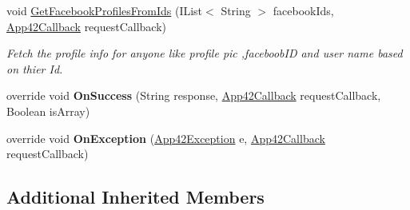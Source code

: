 \begin{DoxyCompactItemize}
void \hyperlink{classcom_1_1shephertz_1_1app42_1_1paas_1_1sdk_1_1windows_1_1social_1_1_social_service_aa997a27f1803f5eb098f029529e848f6}{Get\+Facebook\+Profiles\+From\+Ids} (I\+List$<$ String $>$ facebook\+Ids, \hyperlink{interfacecom_1_1shephertz_1_1app42_1_1paas_1_1sdk_1_1windows_1_1_app42_callback}{App42\+Callback} request\+Callback)
\begin{DoxyCompactList}\small\item\em Fetch the profile info for anyone like profile pic ,faceboob\+I\+D and user name based on thier Id. \end{DoxyCompactList}\item 
\hypertarget{classcom_1_1shephertz_1_1app42_1_1paas_1_1sdk_1_1windows_1_1social_1_1_social_service_a6af69417c29297fec7b07ab0f7f36aae}{override void {\bfseries On\+Success} (String response, \hyperlink{interfacecom_1_1shephertz_1_1app42_1_1paas_1_1sdk_1_1windows_1_1_app42_callback}{App42\+Callback} request\+Callback, Boolean is\+Array)}\label{classcom_1_1shephertz_1_1app42_1_1paas_1_1sdk_1_1windows_1_1social_1_1_social_service_a6af69417c29297fec7b07ab0f7f36aae}

\item 
\hypertarget{classcom_1_1shephertz_1_1app42_1_1paas_1_1sdk_1_1windows_1_1social_1_1_social_service_ae6686c3df8d4dff6d935943286451510}{override void {\bfseries On\+Exception} (\hyperlink{classcom_1_1shephertz_1_1app42_1_1paas_1_1sdk_1_1windows_1_1_app42_exception}{App42\+Exception} e, \hyperlink{interfacecom_1_1shephertz_1_1app42_1_1paas_1_1sdk_1_1windows_1_1_app42_callback}{App42\+Callback} request\+Callback)}\label{classcom_1_1shephertz_1_1app42_1_1paas_1_1sdk_1_1windows_1_1social_1_1_social_service_ae6686c3df8d4dff6d935943286451510}

\end{DoxyCompactItemize}
\subsection*{Additional Inherited Members}


